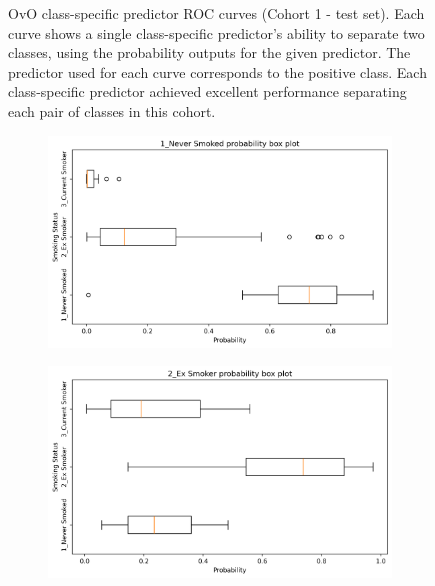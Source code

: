 \documentclass[draft]{article} %
\begin{document}
\begin{figure}[p]
\begin{subfigure}{0.46\linewidth}
    \end{subfigure}
    \caption[Class-specific predictor ROC curves (Cohort 1)]{OvO class-specific predictor ROC curves (Cohort 1 - test set). Each curve shows a single class-specific predictor's ability to separate two classes, using the probability outputs for the given predictor. The predictor used for each curve corresponds to the positive class. Each class-specific predictor achieved excellent performance separating each pair of classes in this cohort.}
    \label{fig:cohort1-initial-rocs}
\end{figure}

\begin{figure}[p]
    \centering
    \begin{subfigure}{0.75\linewidth}
        \centering
        \includegraphics[width=\linewidth]{cohort1/test_boxplot_1.png}
    \end{subfigure}
    \begin{subfigure}{0.75\linewidth}
        \centering
        \includegraphics[width=\linewidth]{cohort1/test_boxplot_2.png}

\end{subfigure}
\end{figure}
\end{document}
